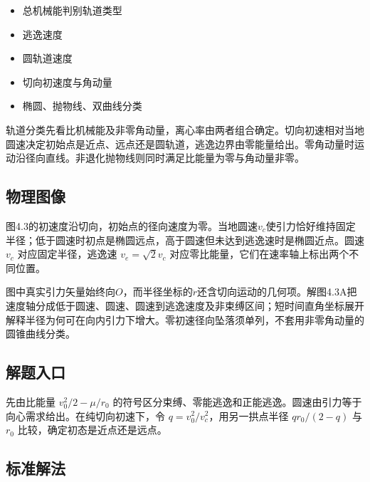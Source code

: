 \documentclass[UTF8,fontset=fandol,a4paper,11pt]{ctexart}
\providecommand{\tightlist}{\setlength{\itemsep}{0pt}\setlength{\parskip}{0pt}}
\begin{document}
\begin{itemize}
\tightlist
\item
  总机械能判别轨道类型
\item
  逃逸速度
\item
  圆轨道速度
\item
  切向初速度与角动量
\item
  椭圆、抛物线、双曲线分类
\end{itemize}

轨道分类先看比机械能及非零角动量，离心率由两者组合确定。切向初速相对当地圆速决定初始点是近点、远点还是圆轨道，逃逸边界由零能量给出。零角动量时运动沿径向直线。非退化抛物线则同时满足比能量为零与角动量非零。




\subsection*{物理图像}

图4.3的初速度沿切向，初始点的径向速度为零。当地圆速$v_c$使引力恰好维持固定半径；低于圆速时初点是椭圆远点，高于圆速但未达到逃逸速时是椭圆近点。圆速 $v_c$ 对应固定半径，逃逸速 $v_e=\sqrt2v_c$ 对应零比能量，它们在速率轴上标出两个不同位置。

图中真实引力矢量始终向$O$，而半径坐标的$\ddot r$还含切向运动的几何项。解图4.3A把速度轴分成低于圆速、圆速、圆速到逃逸速度及非束缚区间；短时间直角坐标展开解释半径为何可在向内引力下增大。零初速径向坠落须单列，不套用非零角动量的圆锥曲线分类。



\subsection*{解题入口}

先由比能量 $v_0^2/2-\mu/r_0$ 的符号区分束缚、零能逃逸和正能逃逸。圆速由引力等于向心需求给出。在纯切向初速下，令 $q=v_0^2/v_c^2$，用另一拱点半径 $qr_0/(2-q)$ 与 $r_0$ 比较，确定初态是近点还是远点。



\subsection*{标准解法}
\end{document}
